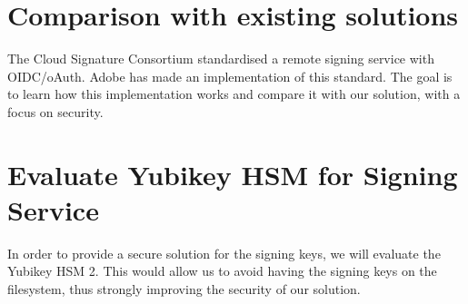 \section{Comparison with existing solutions}
\label{section:comparison}

The Cloud Signature Consortium standardised a remote signing service with OIDC/oAuth.
Adobe has made an implementation of this standard.
The goal is to learn how this implementation works and compare it with our solution, with a focus on security.

\section{Evaluate Yubikey HSM for Signing Service}
\label{section:evaluateyubikey}

In order to provide a secure solution for the signing keys, we will evaluate the Yubikey HSM 2.
This would allow us to avoid having the signing keys on the filesystem, thus strongly improving the security of our solution.
